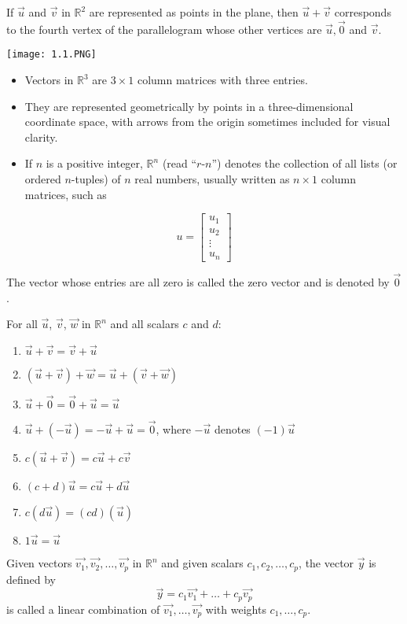 \documentclass[../linalg.tex]{subfiles}
\begin{document}
If $\vec{u}$ and $\vec{v}$ in $\mathbb{R}^2$ are represented as points in the plane, then $\vec{u}+\vec{v}$ corresponds to the fourth vertex of the parallelogram whose other vertices are $\vec{u}, \vec{0}$ and $\vec{v}$.
\begin{center}
    \texttt{[image: 1.1.PNG]}
\end{center}

\begin{itemize}
    \item Vectors in $\mathbb{R}^3$ are $3\times 1$ column matrices with three entries.
    \item They are represented geometrically by points in a three-dimensional coordinate space, with arrows from the origin sometimes included for visual clarity.
    \item If $n$ is a positive integer, $\mathbb{R}^n$ (read ``$r$-$n$'') denotes the collection of all lists (or ordered $n$-tuples) of $n$ real numbers, usually written as $n\times 1$ column matrices, such as 
\end{itemize}
\[ u = \begin{bmatrix}
    u_1 \\ u_2 \\ \vdots \\ u_n
\end{bmatrix}\]

The vector whose entries are all zero is called the zero vector and is denoted by $\vec{0}$.

For all $\vec{u}$, $\vec{v}$, $\vec{w}$ in $\mathbb{R}^n$ and all scalars $c$ and $d$:
\begin{enumerate}
    \item $\vec{u}+\vec{v}=\vec{v}+\vec{u}$
    \item $(\vec{u}+\vec{v})+\vec{w}=\vec{u}+(\vec{v}+\vec{w})$
    \item $\vec{u}+\vec{0}=\vec{0}+\vec{u}=\vec{u}$
    \item $\vec{u}+(-\vec{u})=-\vec{u}+\vec{u}=\vec{0}$, where $-\vec{u}$ denotes $(-1)\vec{u}$
    \item $c(\vec{u}+\vec{v})=c\vec{u}+c\vec{v}$
    \item $(c+d)\vec{u}=c\vec{u}+d\vec{u}$
    \item $c(d\vec{u})=(cd)(\vec{u})$
    \item $1\vec{u}=\vec{u}$
\end{enumerate}

Given vectors $\vec{v_1}, \vec{v_2},\dots,\vec{v_p}$ in $\mathbb{R}^n$ and given scalars $c_1, c_2,\dots,c_p$, the vector $\vec{y}$ is defined by 
\[ \vec{y}=c_1\vec{v_1}+\dots +c_p\vec{v_p}\]
is called a linear combination of $\vec{v_1},\dots,\vec{v_p}$ with weights $c_1,\dots,c_p$.
\end{document}
